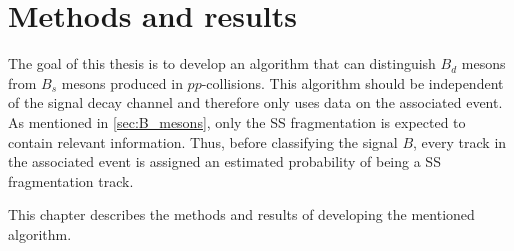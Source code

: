 \chapter{Methods and results}


The goal of this thesis is to develop an algorithm that can distinguish $B_d$ mesons from $B_s$ mesons produced in $pp$-collisions.
This algorithm should be independent of the signal decay channel and therefore only uses data on the associated event.
As mentioned in \autoref{sec:B_mesons}, only the SS fragmentation is expected to contain relevant information.
Thus, before classifying the signal $B$, every track in the associated event is assigned an estimated probability of being a SS fragmentation track.

This chapter describes the methods and results of developing the mentioned algorithm.





